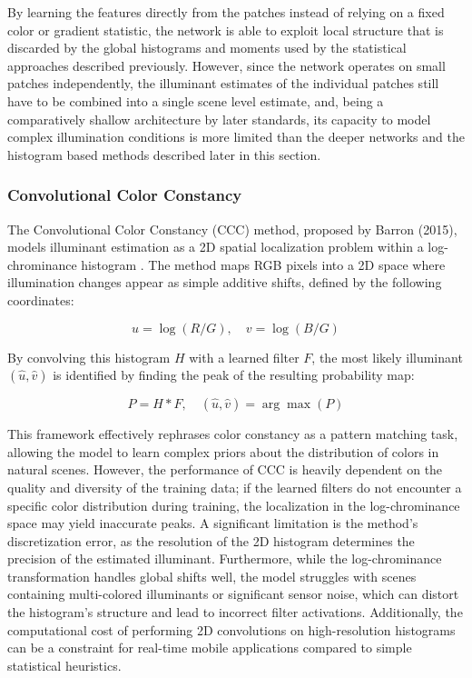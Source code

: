 By learning the features directly from the patches instead of relying on a fixed color or gradient statistic, the network is able to exploit local structure that is discarded by the global histograms and moments used by the statistical approaches described previously. However, since the network operates on small patches independently, the illuminant estimates of the individual patches still have to be combined into a single scene level estimate, and, being a comparatively shallow architecture by later standards, its capacity to model complex illumination conditions is more limited than the deeper networks and the histogram based methods described later in this section.

\subsubsection{Convolutional Color Constancy}

The Convolutional Color Constancy (CCC) method, proposed by Barron (2015), models illuminant estimation as a 2D spatial localization problem within a log-chrominance histogram \cite{convolutional_color_constancy}. The method maps RGB pixels into a 2D space where illumination changes appear as simple additive shifts, defined by the following coordinates:

\begin{equation}
u = \log(R/G), \quad v = \log(B/G)
\end{equation}

By convolving this histogram $H$ with a learned filter $F$, the most likely illuminant $(\hat{u}, \hat{v})$ is identified by finding the peak of the resulting probability map: 

\begin{equation}
P = H * F, \quad (\hat{u}, \hat{v}) = \arg\max(P)
\end{equation}

This framework effectively rephrases color constancy as a pattern matching task, allowing the model to learn complex priors about the distribution of colors in natural scenes. However, the performance of CCC is heavily dependent on the quality and diversity of the training data; if the learned filters do not encounter a specific color distribution during training, the localization in the log-chrominance space may yield inaccurate peaks. A significant limitation is the method's discretization error, as the resolution of the 2D histogram determines the precision of the estimated illuminant. Furthermore, while the log-chrominance transformation handles global shifts well, the model struggles with scenes containing multi-colored illuminants or significant sensor noise, which can distort the histogram's structure and lead to incorrect filter activations. Additionally, the computational cost of performing 2D convolutions on high-resolution histograms can be a constraint for real-time mobile applications compared to simple statistical heuristics.

